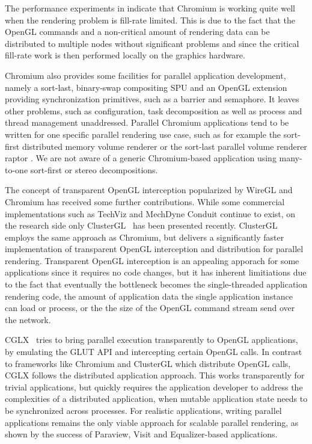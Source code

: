 The performance experiments in \cite{HHNFAKK:02} indicate that Chromium is
working quite well when the rendering problem is fill-rate limited. This is due
to the fact that the OpenGL commands and a non-critical amount of rendering data
can be distributed to multiple nodes without significant problems and since the
critical fill-rate work is then performed locally on the graphics hardware.

Chromium also provides some facilities for parallel application development,
namely a sort-last, binary-swap compositing SPU and an OpenGL extension
providing synchronization primitives, such as a barrier and semaphore. It leaves
other problems, such as configuration, task decomposition as well as process and
thread management unaddressed. Parallel Chromium applications tend to be written
for one specific parallel rendering use case, such as for example the sort-first
distributed memory volume renderer \cite{BHPB:03} or the sort-last parallel
volume renderer raptor \cite{Raptor}. We are not aware of a generic
Chromium-based application using many-to-one sort-first or stereo
decompositions.

The concept of transparent OpenGL interception popularized by WireGL and
Chromium has received some further contributions. While some commercial
implementations such as {TechViz} and {MechDyne Conduit} continue to exist, on
the research side only {ClusterGL}~\cite{NHM:11} has been presented recently.
{ClusterGL} employs the same approach as {Chromium}, but delivers a
significantly faster implementation of transparent OpenGL interception and
distribution for parallel rendering. Transparent OpenGL interception is an
appealing apporach for some applications since it requires no code changes, but
it has inherent limitiations due to the fact that eventually the bottleneck
becomes the single-threaded application rendering code, the amount of
application data the single application instance can load or process, or the the
size of the OpenGL command stream send over the network.

{CGLX}~\cite{DK:11} tries to bring parallel execution transparently to
OpenGL applications, by emulating the GLUT API and intercepting certain OpenGL
calls. In contrast to frameworks like {Chromium} and {ClusterGL}
which distribute OpenGL calls, {CGLX} follows the distributed application
approach. This works transparently for trivial applications, but quickly
requires the application developer to address the complexities of a distributed
application, when mutable application state needs to be synchronized across
processes. For realistic applications, writing parallel applications remains the
only viable approach for scalable parallel rendering, as shown by the success of
 {Paraview}, {Visit} and {Equalizer}-based applications.

